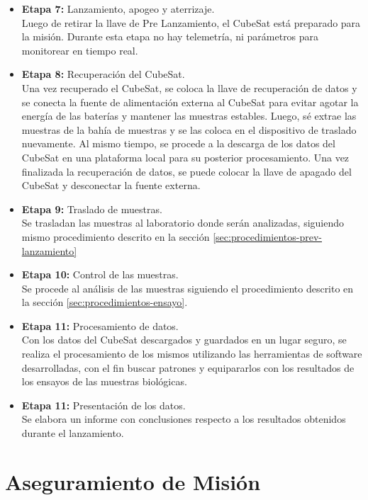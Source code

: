 \begin{itemize}
      carga del Cohete. En este estado, el CubeSat seguirá teniendo el puerto de comunicación vía WiFi disponible, hasta
      que se retire la llave de Pre Lanzamiento o "Remove Before Flight".
    \item \textbf{Etapa 7:} Lanzamiento, apogeo y aterrizaje.\\
      Luego de retirar la llave de Pre Lanzamiento, el CubeSat está preparado para la misión. Durante esta etapa
      no hay telemetría, ni parámetros para monitorear en tiempo real.
    \item \textbf{Etapa 8:} Recuperación del CubeSat.\\
      Una vez recuperado el CubeSat, se coloca la llave de recuperación de datos y se conecta la fuente de
      alimentación externa al CubeSat para evitar agotar la energía de las baterías y mantener las muestras estables. Luego, sé
      extrae las muestras de la bahía de muestras y se las coloca en el dispositivo de traslado nuevamente.
      Al mismo tiempo, se procede a la descarga de los datos del CubeSat en una plataforma local para su posterior procesamiento.
      Una vez finalizada la recuperación de datos, se puede colocar la llave de apagado del CubeSat y desconectar la fuente externa.
    \item \textbf{Etapa 9:} Traslado de muestras.\\
        Se trasladan las muestras al laboratorio donde serán analizadas, siguiendo mismo procedimiento descrito en la sección \ref{sec:procedimientos-prev-lanzamiento}
    \item \textbf{Etapa 10:} Control de las muestras.\\
      Se procede al análisis de las muestras siguiendo el procedimiento descrito en la sección \ref{sec:procedimientos-ensayo}.
    \item \textbf{Etapa 11:} Procesamiento de datos.\\
      Con los datos del CubeSat descargados y guardados en un lugar seguro, se realiza el procesamiento de los mismos utilizando las
      herramientas de software desarrolladas, con el fin buscar patrones y equipararlos con los resultados de los ensayos
      de las muestras biológicas.
  \item \textbf{Etapa 11:} Presentación de los datos.\\
      Se elabora un informe con conclusiones respecto a los resultados obtenidos durante el lanzamiento.
  \end{itemize}

\section{Aseguramiento de Misión}

